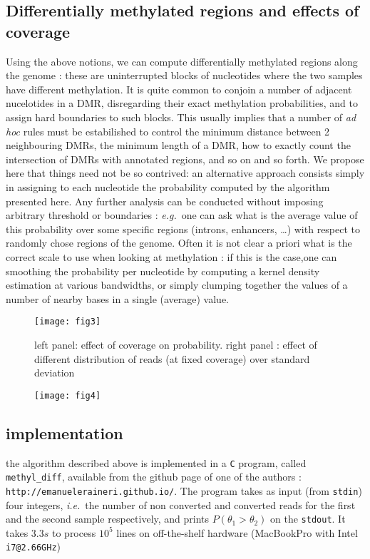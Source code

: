 \documentclass[11pt]{amsart}
\newcommand{\ie}{\textit{i.e.}\ }
\newcommand{\eg}{\textit{e.g.}\ }
\begin{document}
\subsection{Differentially methylated regions and effects of coverage}
Using the above notions, we can compute differentially methylated regions along the genome : these are uninterrupted blocks of nucleotides where the two samples have different methylation.
It is quite common to conjoin a number of adjacent nucelotides in a DMR, disregarding their exact methylation probabilities, and to assign hard boundaries to such blocks. This usually implies that a number of \textit{ad hoc} rules must be estabilished to control the minimum distance between 2 neighbouring DMRs, the minimum length of a DMR, how to exactly count the intersection of DMRs with annotated regions, and so on and so forth. We propose here that things need not be so contrived: an alternative approach consists simply in assigning to each nucleotide the probability computed by the algorithm presented here. Any further analysis can be conducted without imposing arbitrary threshold or boundaries : \eg one can ask what is the average value of this probability over some specific regions (introns, enhancers, \dots) with respect to randomly chose regions of the genome. Often it is not clear a priori what is the correct scale to use when looking at methylation : if this is the case,one can smoothing the probability per nucleotide by computing a kernel density estimation at various bandwidths, or simply clumping together the values of a number of nearby bases in a single (average) value. 
\begin{figure}[h]
\caption{left panel: effect of coverage on probability. right panel : effect of 
different distribution of reads (at fixed coverage) over standard deviation}
\texttt{[image: fig3]}
\label{pvalues}
\end{figure}
\begin{figure}[h]
\caption{}
\texttt{[image: fig4]}
\label{cov}
\end{figure}

\subsection{implementation}
the algorithm described above is implemented in a \verb=C= program, called \verb=methyl_diff=, available from the github page of one of the authors : \verb=http://emanueleraineri.github.io/=. The program takes as input (from \verb=stdin=) four integers, \ie the number of non converted and converted reads for the first and the second sample respectively, and prints $P(\theta_1>\theta_2)$ on the \verb=stdout=. It takes $3.3s$ to process $10^5$ lines on off-the-shelf hardware (MacBookPro with Intel \verb=i7@2.66GHz=) 


\end{document}
